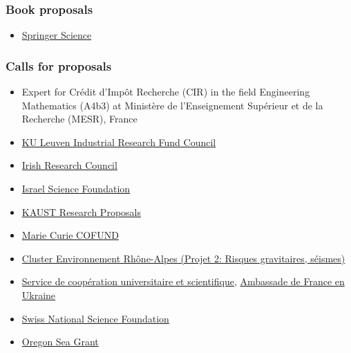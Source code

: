 \documentclass[final, a4paper, oneside, 12pt]{article}
\numberwithin{equation}{section}
\begin{document}
\subsubsection{Book proposals}

  \begin{itemize}
    \item \href{http://www.springer.com/}{Springer Science}
  \end{itemize}

\subsubsection{Calls for proposals}

  \begin{itemize}

    \item Expert for Cr\'edit d'Imp\^ot Recherche (CIR) in the field Engineering Mathematics (A4b3) at Minist\`ere de l'Enseignement Sup\'erieur et de la Recherche (MESR), France

    \item \href{https://research.kuleuven.be/en/collaborate/science_business/iof/}{KU Leuven Industrial Research Fund Council}
  
    \item \href{http://research.ie/}{Irish Research Council}
    
    \item \href{https://www.isf.org.il/}{Israel Science Foundation}
    
    \item \href{https://www.kaust.edu.sa/en}{KAUST Research Proposals}
  
    \item \href{http://www.ulg.ac.be/cms/rv_2913816/en/about}{Marie Curie COFUND}
    
    \item \href{http://www.cluster-environnement.net/le-programme-scientifique/les-projets}%
    {Cluster Environnement Rh\^one-Alpes (Projet 2: Risques gravitaires, s\'eismes)}
    
    \item \href{http://ambafrance-ua.org/spip.php?article1409}%
    {Service de coop\'eration universitaire et scientifique}, \href{http://ambafrance-ua.org/spip.php?article1409}%
    {Ambassade de France en Ukraine}

    \item \href{https://www.snf.ch/en/}{Swiss National Science Foundation}
    
    \item \href{http://seagrant.oregonstate.edu/}{Oregon Sea Grant}
    
  \end{itemize}
  
\end{document}
